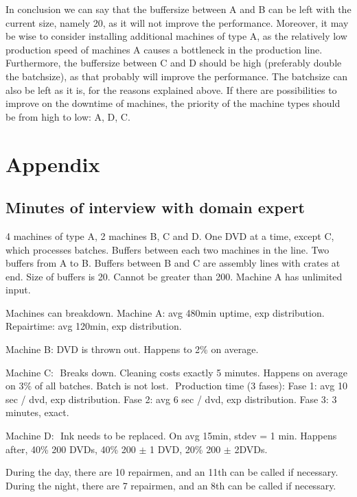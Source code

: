\documentclass{report}
\begin{document}
In conclusion we can say that the buffersize between A and B can be left with the current size, namely 20, as it will not improve the performance.
Moreover, it may be wise to consider installing additional machines of type A, as the relatively low production speed of machines A causes a bottleneck in the production line.
Furthermore, the buffersize between C and D should be high (preferably double the batchsize), as that probably will improve the performance.
The batchsize can also be left as it is, for the reasons explained above.
If there are possibilities to improve on the downtime of machines, the priority of the machine types should be from high to low: A, D, C.

\chapter*{Appendix}

\section*{Minutes of interview with domain expert}

4 machines of type A, 2 machines B, C and D.
One DVD at a time, except C, which processes batches.
Buffers between each two machines in the line.
Two buffers from A to B.
Buffers between B and C are assembly lines with crates at end.
Size of buffers is 20.
Cannot be greater than 200.
Machine A has unlimited input.

Machines can breakdown.
Machine A: avg 480min uptime, exp distribution.
Repairtime: avg 120min, exp distribution.

Machine B:
    DVD is thrown out.
    Happens to 2\% on average.

Machine C:
­ Breaks down.
  Cleaning costs exactly 5 minutes.
  Happens on average on 3\% of all batches.
  Batch is not lost.
  ­ Production time (3 fases):
        Fase 1: avg 10 sec / dvd, exp distribution.
        Fase 2: avg 6 sec / dvd, exp distribution.
        Fase 3: 3 minutes, exact.

Machine D:
­ Ink needs to be replaced.
  On avg 15min, stdev = 1 min.
  Happens after, 40\% 200 DVDs, 40\% 200 $\pm$ 1 DVD, 20\% 200 $\pm$ 2DVDs.

During the day, there are 10 repairmen, and an 11th can be called if necessary.
During the night, there are 7 repairmen, and an 8th can be called if necessary.
\end{document}

